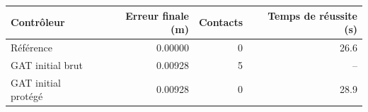 \begin{tabular}{lrrr}
\toprule
Contrôleur & Erreur finale (m) & Contacts & Temps de réussite (s)\\\midrule
Référence & 0.00000 & 0 & 26.6 \\
GAT initial brut & 0.00928 & 5 & -- \\
GAT initial protégé & 0.00928 & 0 & 28.9 \\
\bottomrule\end{tabular}

